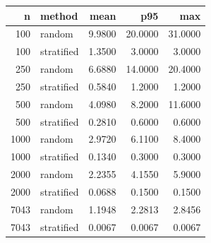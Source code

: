 \begin{tabular}{rlrrr}
\toprule
n & method & mean & p95 & max \\
\midrule
100 & random & 9.9800 & 20.0000 & 31.0000 \\
100 & stratified & 1.3500 & 3.0000 & 3.0000 \\
250 & random & 6.6880 & 14.0000 & 20.4000 \\
250 & stratified & 0.5840 & 1.2000 & 1.2000 \\
500 & random & 4.0980 & 8.2000 & 11.6000 \\
500 & stratified & 0.2810 & 0.6000 & 0.6000 \\
1000 & random & 2.9720 & 6.1100 & 8.4000 \\
1000 & stratified & 0.1340 & 0.3000 & 0.3000 \\
2000 & random & 2.2355 & 4.1550 & 5.9000 \\
2000 & stratified & 0.0688 & 0.1500 & 0.1500 \\
7043 & random & 1.1948 & 2.2813 & 2.8456 \\
7043 & stratified & 0.0067 & 0.0067 & 0.0067 \\
\bottomrule
\end{tabular}
